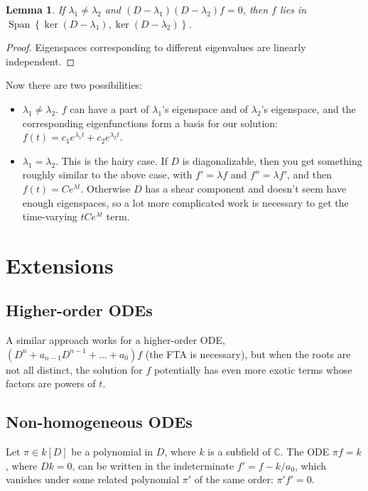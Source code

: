\documentclass[oneside]{memoir}
\newtheorem{lemma}{Lemma}
\begin{document}
	\begin{lemma}
		If \(\lambda_1 \neq \lambda_2\) and \((D - \lambda_1)(D - \lambda_2)f = 0\), then \(f\) lies in \(\operatorname{Span}\left\{\ker (D - \lambda_1), \ker (D - \lambda_2)\right\}\).
	\end{lemma}
	\begin{proof}
		Eigenspaces corresponding to different eigenvalues are linearly independent.
		
	\end{proof}
	
	Now there are two possibilities:
	\begin{itemize}
		\item \(\lambda_1 \neq \lambda_2\). \(f\) can have a part of \(\lambda_1\)'s eigenspace and of \(\lambda_2\)'s eigenspace, and the corresponding eigenfunctions form a basis for our solution: \(f(t) = c_1 e^{\lambda_1t} + c_2 e^{\lambda_2t}\).
	
		\item \(\lambda_1 = \lambda_2\). This is the hairy case. If \(D\) is diagonalizable, then you get something roughly similar to the above case, with \(f' = \lambda f\) and \(f'' = \lambda f'\), and then \(f(t) = Ce^{\lambda t}\). Otherwise \(D\) has a shear component and doesn't seem have enough eigenspaces, so a lot more complicated work is necessary to get the time-varying \(tCe^{\lambda t}\) term.
	\end{itemize}
	
	\section{Extensions}
	\subsection{Higher-order ODEs}
	A similar approach works for a higher-order ODE, \((D^n + a_{n - 1} D^{n - 1} + \ldots + a_0)f\) (the FTA is necessary), but when the roots are not all distinct, the solution for \(f\) potentially has even more exotic terms whose factors are powers of \(t\).
	
	\subsection{Non-homogeneous ODEs}
	Let \(\pi\in k[D]\) be a polynomial in \(D\), where \(k\) is a subfield of \(\mathbb{C}\). The ODE \(\pi f = k\), where \(Dk = 0\), can be written in the indeterminate \(f' = f - k/a_0\), which vanishes under some related polynomial \(\pi'\) of the same order: \(\pi'f' = 0\).
\end{document}
